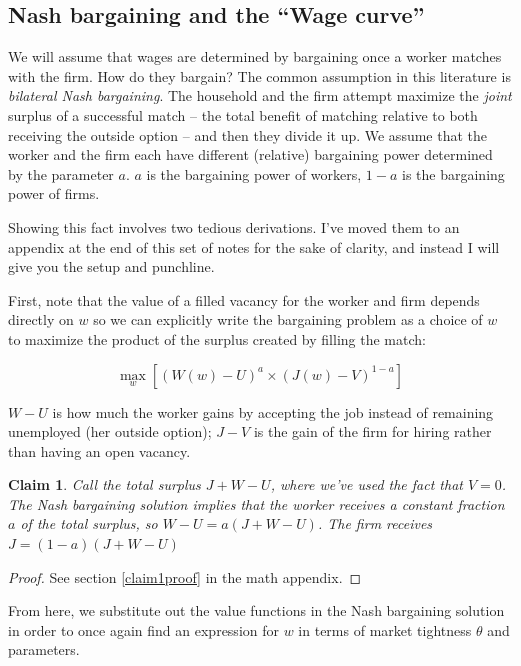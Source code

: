 \documentclass[12pt]{article}
\newtheorem{theorem}{Claim}
\begin{document}
\subsection*{Nash bargaining and the ``Wage curve''}

We will assume that wages are determined by bargaining  once a worker matches with the firm. How do they bargain? The common assumption in this literature is \textit{bilateral Nash bargaining}.  The household and the firm attempt maximize the \textit{joint} surplus of a successful match -- the total benefit of matching relative to both receiving the outside option -- and then they divide it up.  We assume that the worker and the firm each have different (relative) bargaining power determined by the parameter $a$.  $a$ is the bargaining power of workers, $1-a$ is the bargaining power of firms.

Showing this fact involves two tedious derivations.  I've moved them to an appendix at the end of this set of notes for the sake of clarity, and instead I will give you the setup and punchline.

First, note that the value of a filled vacancy for the worker and firm depends directly on $w$ so we can explicitly write the bargaining problem as a choice of $w$ to maximize the product of the surplus created by filling the match:

$$ \max_w [(W(w) - U)^a \times (J(w) - V)^{1-a}] $$

 $W - U$ is how much the worker gains by accepting the job instead of remaining unemployed (her outside option); $J - V$ is the gain of the firm for hiring rather than having an open vacancy.




\begin{theorem} \label{claim1}
Call the total surplus $J + W - U$, where we've used the fact that $ V= 0$.  The Nash bargaining solution implies that the worker receives  a constant fraction $a$ of the total surplus, so $W-U = a (J  + W - U)$.  The firm receives  $J = (1-a)(J + W -U)$

\end{theorem}

\begin{proof} 
See section \ref{claim1proof} in the math appendix.
\end{proof}


From here, we substitute out the value functions in the Nash bargaining solution in order to once again find an expression for $w$ in terms of market tightness $\theta$ and parameters.  
\end{document}
